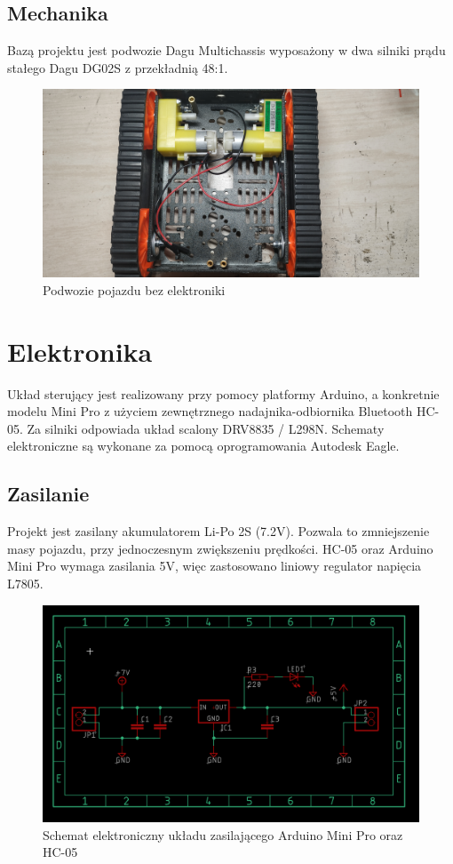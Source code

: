 \documentclass{report}
\begin{document}
        \subsection{Mechanika}
        Bazą projektu jest podwozie Dagu Multichassis wyposażony w dwa silniki prądu stałego Dagu DG02S z przekładnią 48:1. 
        \begin{figure}[H]
            \centering
            \includegraphics[scale=0.1]{tank_1.jpg}
            \caption{Podwozie pojazdu bez elektroniki}
        \end{figure}
    \section{Elektronika}
        Układ sterujący jest realizowany przy pomocy platformy Arduino, a konkretnie modelu Mini Pro z użyciem zewnętrznego nadajnika-odbiornika Bluetooth HC-05. Za silniki odpowiada układ scalony DRV8835 / L298N.
        Schematy elektroniczne są wykonane za pomocą oprogramowania Autodesk Eagle.
        
       
        \subsection{Zasilanie}
        Projekt jest zasilany akumulatorem Li-Po 2S (7.2V). Pozwala to zmniejszenie masy pojazdu, przy jednoczesnym zwiększeniu prędkości. 
        HC-05 oraz Arduino Mini Pro wymaga zasilania 5V, więc zastosowano liniowy regulator napięcia L7805. 
        \begin{figure}[H]
            \centering
            \includegraphics[scale=0.4]{eagle_1.png}
            \caption{Schemat elektroniczny układu zasilającego Arduino Mini Pro oraz HC-05}
        \end{figure} 
\end{document}
